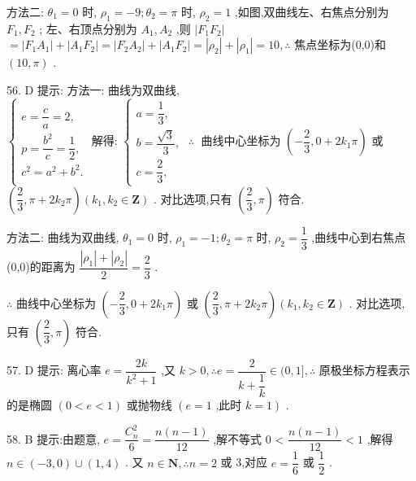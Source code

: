 方法二: ${\theta }_{1} = 0$ 时, ${\rho }_{1} =  - 9;{\theta }_{2} = \pi$ 时, ${\rho }_{2} = 1$ ,如图,双曲线左、右焦点分别为 ${F}_{1},{F}_{2}$ ; 左、右顶点分别为 ${A}_{1},{A}_{2}$ ,则 $\left| {{F}_{1}{F}_{2}}\right|$  $= \left| {{F}_{1}{A}_{1}}\right|  + \left| {{A}_{1}{F}_{2}}\right|  = \left| {{F}_{2}{A}_{2}}\right|  + \left| {{A}_{1}{F}_{2}}\right|  = \left| {\rho }_{2}\right|  + \left| {\rho }_{1}\right|  = {10},\therefore$ 焦点坐标为(0,0)和 $\left( {{10},\pi }\right)$ .

56. D 提示: 方法一: 曲线为双曲线, $\left\{  {\begin{array}{l} e = \dfrac{c}{a} = 2, \\  p = \dfrac{{b}^{2}}{c} = \dfrac{1}{2}, \\  {c}^{2} = {a}^{2} + {b}^{2}. \end{array}\text{ 解得: }\left\{  {\begin{array}{l} a = \dfrac{1}{3}, \\  b = \dfrac{\sqrt{3}}{3}, \\  c = \dfrac{2}{3}, \end{array}\;\therefore \;\text{ 曲线中心坐标为 }\left( {-\dfrac{2}{3},0 + 2{k}_{1}\pi }\right) \text{ 或 }}\right. }\right.$  $\left( {\dfrac{2}{3},\pi  + 2{k}_{2}\pi }\right) \left( {{k}_{1},{k}_{2} \in  \mathbf{Z}}\right)$ . 对比选项,只有 $\left( {\dfrac{2}{3},\pi }\right)$ 符合.

方法二: 曲线为双曲线, ${\theta }_{1} = 0$ 时, ${\rho }_{1} =  - 1;{\theta }_{2} = \pi$ 时, ${\rho }_{2} = \dfrac{1}{3}$ ,曲线中心到右焦点(0,0)的距离为 $\dfrac{\left| {\rho }_{1}\right|  + \left| {\rho }_{2}\right| }{2} = \dfrac{2}{3}$ .

$\therefore$ 曲线中心坐标为 $\left( {-\dfrac{2}{3},0 + 2{k}_{1}\pi }\right)$ 或 $\left( {\dfrac{2}{3},\pi  + 2{k}_{2}\pi }\right) \left( {{k}_{1},{k}_{2} \in  \mathbf{Z}}\right)$ . 对比选项,只有 $\left( {\dfrac{2}{3},\pi }\right)$ 符合.

57. D 提示: 离心率 $e = \dfrac{2k}{{k}^{2} + 1}$ ,又 $k > 0,\therefore e = \dfrac{2}{k + \dfrac{1}{k}} \in  (0,1\rbrack ,\therefore$ 原极坐标方程表示的是椭圆 $\left( {0 < e < 1}\right)$ 或抛物线 $\left( {e = 1\text{ ,此时 }k = 1}\right)$ .

58. B 提示:由题意, $e = \dfrac{{C}_{n}^{2}}{6} = \dfrac{n\left( {n - 1}\right) }{12}$ ,解不等式 0 < $\dfrac{n\left( {n - 1}\right) }{12} < 1$ ,解得 $n \in  \left( {-3,0}\right)  \cup  \left( {1,4}\right)$ . 又 $n \in  \mathbf{N},\therefore n = 2$ 或 3,对应 $e = \dfrac{1}{6}$ 或 $\dfrac{1}{2}$ .


